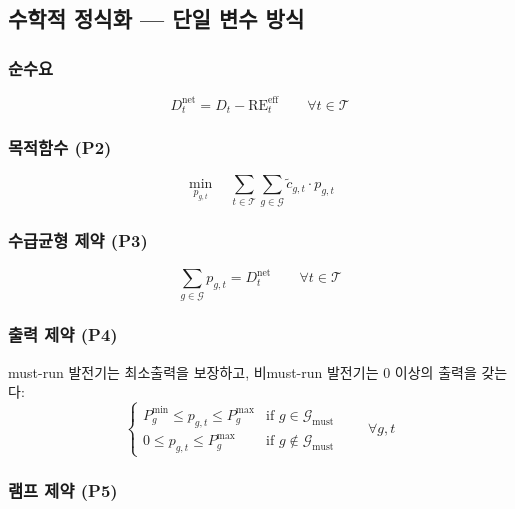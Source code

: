 \documentclass[11pt, a4paper]{article}
\begin{document}
\subsection{수학적 정식화 --- 단일 변수 방식}

\subsubsection{순수요}
\begin{equation}
    D_t^{\text{net}} = D_t - \text{RE}_t^{\text{eff}} \qquad \forall t \in \mathcal{T}
\end{equation}

\subsubsection{목적함수 (P2)}
\begin{equation}\label{eq:pre_obj}
    \boxed{\min_{p_{g,t}} \quad \sum_{t \in \mathcal{T}} \sum_{g \in \mathcal{G}} \tilde{c}_{g,t} \cdot p_{g,t}}
\end{equation}

\subsubsection{수급균형 제약 (P3)}
\begin{equation}\label{eq:pre_balance}
    \sum_{g \in \mathcal{G}} p_{g,t} = D_t^{\text{net}} \qquad \forall t \in \mathcal{T}
\end{equation}

\subsubsection{출력 제약 (P4)}

must-run 발전기는 최소출력을 보장하고, 비must-run 발전기는 0 이상의 출력을 갖는다:
\begin{equation}\label{eq:pre_bounds}
    \begin{cases}
        P_g^{\min} \leq p_{g,t} \leq P_g^{\max} & \text{if } g \in \mathcal{G}_{\text{must}} \\
        0 \leq p_{g,t} \leq P_g^{\max}           & \text{if } g \notin \mathcal{G}_{\text{must}}
    \end{cases}
    \qquad \forall g, t
\end{equation}

\subsubsection{램프 제약 (P5)}
\end{document}
